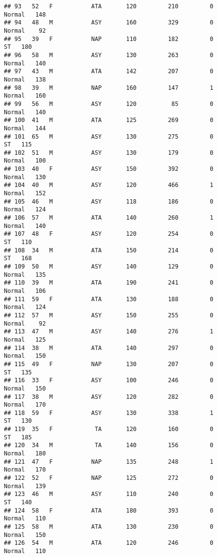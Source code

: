 \documentclass[
]{article}
\begin{document}
\begin{verbatim}
## 93   52   F           ATA       120         210         0     Normal   148
## 94   48   M           ASY       160         329         0     Normal    92
## 95   39   F           NAP       110         182         0         ST   180
## 96   58   M           ASY       130         263         0     Normal   140
## 97   43   M           ATA       142         207         0     Normal   138
## 98   39   M           NAP       160         147         1     Normal   160
## 99   56   M           ASY       120          85         0     Normal   140
## 100  41   M           ATA       125         269         0     Normal   144
## 101  65   M           ASY       130         275         0         ST   115
## 102  51   M           ASY       130         179         0     Normal   100
## 103  40   F           ASY       150         392         0     Normal   130
## 104  40   M           ASY       120         466         1     Normal   152
## 105  46   M           ASY       118         186         0     Normal   124
## 106  57   M           ATA       140         260         1     Normal   140
## 107  48   F           ASY       120         254         0         ST   110
## 108  34   M           ATA       150         214         0         ST   168
## 109  50   M           ASY       140         129         0     Normal   135
## 110  39   M           ATA       190         241         0     Normal   106
## 111  59   F           ATA       130         188         0     Normal   124
## 112  57   M           ASY       150         255         0     Normal    92
## 113  47   M           ASY       140         276         1     Normal   125
## 114  38   M           ATA       140         297         0     Normal   150
## 115  49   F           NAP       130         207         0         ST   135
## 116  33   F           ASY       100         246         0     Normal   150
## 117  38   M           ASY       120         282         0     Normal   170
## 118  59   F           ASY       130         338         1         ST   130
## 119  35   F            TA       120         160         0         ST   185
## 120  34   M            TA       140         156         0     Normal   180
## 121  47   F           NAP       135         248         1     Normal   170
## 122  52   F           NAP       125         272         0     Normal   139
## 123  46   M           ASY       110         240         0         ST   140
## 124  58   F           ATA       180         393         0     Normal   110
## 125  58   M           ATA       130         230         0     Normal   150
## 126  54   M           ATA       120         246         0     Normal   110

\end{verbatim}
\end{document}
